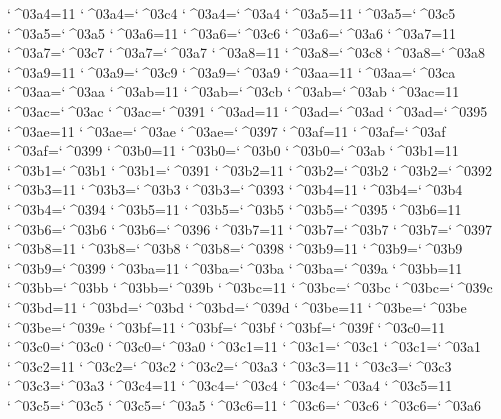 \catcode`^^^^03a4=11 \lccode`^^^^03a4=`^^^^03c4 \uccode`^^^^03a4=`^^^^03a4 
\catcode`^^^^03a5=11 \lccode`^^^^03a5=`^^^^03c5 \uccode`^^^^03a5=`^^^^03a5 
\catcode`^^^^03a6=11 \lccode`^^^^03a6=`^^^^03c6 \uccode`^^^^03a6=`^^^^03a6 
\catcode`^^^^03a7=11 \lccode`^^^^03a7=`^^^^03c7 \uccode`^^^^03a7=`^^^^03a7 
\catcode`^^^^03a8=11 \lccode`^^^^03a8=`^^^^03c8 \uccode`^^^^03a8=`^^^^03a8 
\catcode`^^^^03a9=11 \lccode`^^^^03a9=`^^^^03c9 \uccode`^^^^03a9=`^^^^03a9 
\catcode`^^^^03aa=11 \lccode`^^^^03aa=`^^^^03ca \uccode`^^^^03aa=`^^^^03aa 
\catcode`^^^^03ab=11 \lccode`^^^^03ab=`^^^^03cb \uccode`^^^^03ab=`^^^^03ab 
\catcode`^^^^03ac=11 \lccode`^^^^03ac=`^^^^03ac \uccode`^^^^03ac=`^^^^0391 
\catcode`^^^^03ad=11 \lccode`^^^^03ad=`^^^^03ad \uccode`^^^^03ad=`^^^^0395 
\catcode`^^^^03ae=11 \lccode`^^^^03ae=`^^^^03ae \uccode`^^^^03ae=`^^^^0397 
\catcode`^^^^03af=11 \lccode`^^^^03af=`^^^^03af \uccode`^^^^03af=`^^^^0399 
\catcode`^^^^03b0=11 \lccode`^^^^03b0=`^^^^03b0 \uccode`^^^^03b0=`^^^^03ab 
\catcode`^^^^03b1=11 \lccode`^^^^03b1=`^^^^03b1 \uccode`^^^^03b1=`^^^^0391 
\catcode`^^^^03b2=11 \lccode`^^^^03b2=`^^^^03b2 \uccode`^^^^03b2=`^^^^0392 
\catcode`^^^^03b3=11 \lccode`^^^^03b3=`^^^^03b3 \uccode`^^^^03b3=`^^^^0393 
\catcode`^^^^03b4=11 \lccode`^^^^03b4=`^^^^03b4 \uccode`^^^^03b4=`^^^^0394 
\catcode`^^^^03b5=11 \lccode`^^^^03b5=`^^^^03b5 \uccode`^^^^03b5=`^^^^0395 
\catcode`^^^^03b6=11 \lccode`^^^^03b6=`^^^^03b6 \uccode`^^^^03b6=`^^^^0396 
\catcode`^^^^03b7=11 \lccode`^^^^03b7=`^^^^03b7 \uccode`^^^^03b7=`^^^^0397 
\catcode`^^^^03b8=11 \lccode`^^^^03b8=`^^^^03b8 \uccode`^^^^03b8=`^^^^0398 
\catcode`^^^^03b9=11 \lccode`^^^^03b9=`^^^^03b9 \uccode`^^^^03b9=`^^^^0399 
\catcode`^^^^03ba=11 \lccode`^^^^03ba=`^^^^03ba \uccode`^^^^03ba=`^^^^039a 
\catcode`^^^^03bb=11 \lccode`^^^^03bb=`^^^^03bb \uccode`^^^^03bb=`^^^^039b 
\catcode`^^^^03bc=11 \lccode`^^^^03bc=`^^^^03bc \uccode`^^^^03bc=`^^^^039c 
\catcode`^^^^03bd=11 \lccode`^^^^03bd=`^^^^03bd \uccode`^^^^03bd=`^^^^039d 
\catcode`^^^^03be=11 \lccode`^^^^03be=`^^^^03be \uccode`^^^^03be=`^^^^039e 
\catcode`^^^^03bf=11 \lccode`^^^^03bf=`^^^^03bf \uccode`^^^^03bf=`^^^^039f 
\catcode`^^^^03c0=11 \lccode`^^^^03c0=`^^^^03c0 \uccode`^^^^03c0=`^^^^03a0 
\catcode`^^^^03c1=11 \lccode`^^^^03c1=`^^^^03c1 \uccode`^^^^03c1=`^^^^03a1 
\catcode`^^^^03c2=11 \lccode`^^^^03c2=`^^^^03c2 \uccode`^^^^03c2=`^^^^03a3 
\catcode`^^^^03c3=11 \lccode`^^^^03c3=`^^^^03c3 \uccode`^^^^03c3=`^^^^03a3 
\catcode`^^^^03c4=11 \lccode`^^^^03c4=`^^^^03c4 \uccode`^^^^03c4=`^^^^03a4 
\catcode`^^^^03c5=11 \lccode`^^^^03c5=`^^^^03c5 \uccode`^^^^03c5=`^^^^03a5 
\catcode`^^^^03c6=11 \lccode`^^^^03c6=`^^^^03c6 \uccode`^^^^03c6=`^^^^03a6 
